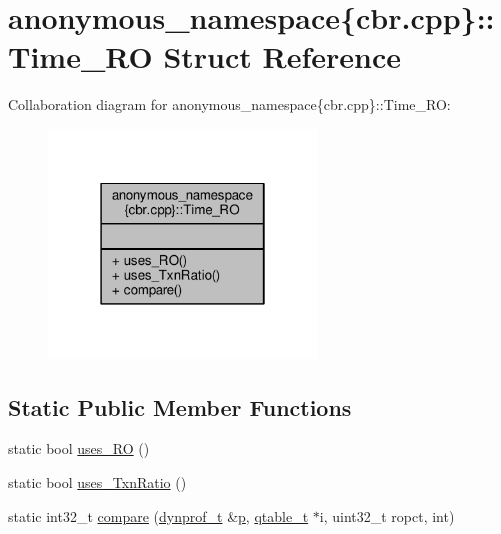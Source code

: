 \hypertarget{structanonymous__namespace_02cbr_8cpp_03_1_1Time__RO}{\section{anonymous\-\_\-namespace\{cbr.\-cpp\}\-:\-:Time\-\_\-\-R\-O Struct Reference}
\label{structanonymous__namespace_02cbr_8cpp_03_1_1Time__RO}
}


Collaboration diagram for anonymous\-\_\-namespace\{cbr.\-cpp\}\-:\-:Time\-\_\-\-R\-O\-:
\nopagebreak
\begin{figure}[H]
\begin{center}
\leavevmode
\includegraphics[width=202pt]{structanonymous__namespace_02cbr_8cpp_03_1_1Time__RO__coll__graph}
\end{center}
\end{figure}
\subsection*{Static Public Member Functions}
\begin{DoxyCompactItemize}
\item 
static bool \hyperlink{structanonymous__namespace_02cbr_8cpp_03_1_1Time__RO_a48cbd76671f932359306b85fdb950fcb}{uses\-\_\-\-R\-O} ()
\item 
static bool \hyperlink{structanonymous__namespace_02cbr_8cpp_03_1_1Time__RO_a91f47f8d06426579831d9e17a5da6570}{uses\-\_\-\-Txn\-Ratio} ()
\item 
static int32\-\_\-t \hyperlink{structanonymous__namespace_02cbr_8cpp_03_1_1Time__RO_ae04543ea27a92e86073a3694cfa2b474}{compare} (\hyperlink{structstm_1_1dynprof__t}{dynprof\-\_\-t} \&\hyperlink{counted__ptr_8hpp_a5c9f59d7c24e3fd6ceae319a968fc3e0}{p}, \hyperlink{structstm_1_1qtable__t}{qtable\-\_\-t} $\ast$i, uint32\-\_\-t ropct, int)
\end{DoxyCompactItemize}


